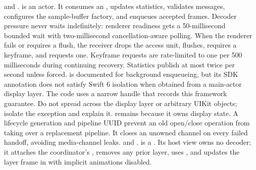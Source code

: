 {}
\markdownRendererSectionEnd \markdownRendererSectionBegin
{}\markdownRendererInterblockSeparator
{}\markdownRendererBlockQuoteBegin
{}  and .\markdownRendererBlockQuoteEnd \markdownRendererInterblockSeparator
{} is an actor. It consumes an , updates statistics, validates messages, configures the sample-buffer factory, and enqueues accepted frames. Decoder pressure never waits indefinitely: renderer readiness gets a 50-millisecond bounded wait with two-millisecond cancellation-aware polling.\markdownRendererParagraphSeparator
{}When the renderer fails or requires a flush, the receiver drops the access unit, flushes, requires a keyframe, and requests one. Keyframe requests are rate-limited to one per 500 milliseconds during continuing recovery. Statistics publish at most twice per second unless forced.\markdownRendererParagraphSeparator
{} is documented for background enqueueing, but its SDK annotation does not satisfy Swift 6 isolation when obtained from a main-actor display layer. The code uses a narrow  handle that records this framework guarantee. Do not spread  across the display layer or arbitrary UIKit objects; isolate the exception and explain it.\markdownRendererParagraphSeparator
{} remains  because it owns display state. A lifecycle generation and pipeline UUID prevent an old open/close operation from taking over a replacement pipeline. It closes an unowned channel on every failed handoff, avoiding media-channel leaks.\markdownRendererInterblockSeparator
{}
\markdownRendererSectionEnd \markdownRendererSectionBegin
{}\markdownRendererInterblockSeparator
{}\markdownRendererBlockQuoteBegin
{}  and .\markdownRendererBlockQuoteEnd \markdownRendererInterblockSeparator
{} is a . Its host view owns no decoder; it attaches the coordinator's , removes any prior layer, uses , and updates the layer frame in  with implicit animations disabled.\markdownRendererParagraphSeparator
